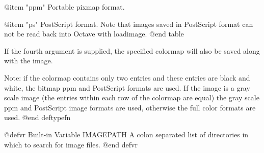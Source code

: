 @item "ppm"
Portable pixmap format.

@item "ps"
PostScript format.  Note that images saved in PostScript format can not
be read back into Octave with loadimage.
@end table

If the fourth argument is supplied, the specified colormap will also be
saved along with the image.

Note: if the colormap contains only two entries and these entries are
black and white, the bitmap ppm and PostScript formats are used.  If the
image is a gray scale image (the entries within each row of the colormap
are equal) the gray scale ppm and PostScript image formats are used,
otherwise the full color formats are used.
@end deftypefn

@defvr {Built-in Variable} IMAGEPATH			
A colon separated list of directories in which to search for image
files.
@end defvr

